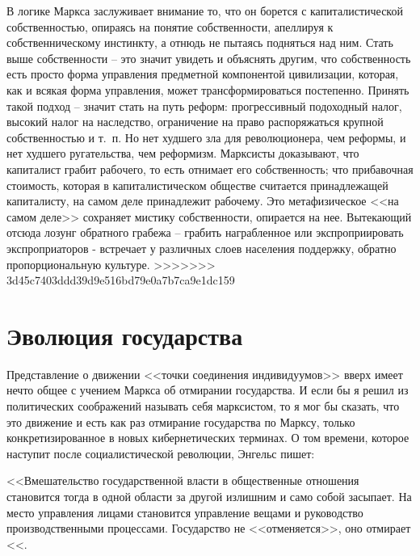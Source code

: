 \documentclass{book}
\begin{document}
В логике Маркса заслуживает внимание то, что он борется с капиталистической собственностью, опираясь на понятие соб­ственности, апеллируя к собственническому инстинкту, а отнюдь не пытаясь подняться над ним. Стать выше собственности -- это значит увидеть и объяснять другим, что собственность есть просто форма управления предметной компонентой цивилиза­ции, которая, как и всякая форма управления, может транс­формироваться постепенно. Принять такой подход -- значит стать на путь реформ: прогрессивный подоходный налог, высо­кий налог на наследство, ограничение на право распоряжаться крупной собственностью и т.~п. Но нет худшего зла для рево­люционера, чем реформы, и нет худшего ругательства, чем ре­формизм. Марксисты доказывают, что капиталист грабит  рабо­чего, то есть отнимает его собственность;  что прибавочная сто­имость, которая в капиталистическом обществе считается при­надлежащей капиталисту, на самом деле  принадлежит рабочему. Это метафизическое <<на самом деле>> сохраняет мистику собст­венности, 
опирается на нее. Вытекающий отсюда лозунг обрат­ного грабежа -- грабить награбленное или экспроприировать экспроприаторов - встречает у различных слоев населения поддержку, обратно пропорциональную культуре.
>>>>>>> 3d45c7403ddd39d9e516bd79e0a7b7ca9e1dc159


\section{Эволюция государства}

Представление о движении <<точки соединения индивиду­умов>> вверх имеет нечто общее с учением Маркса об отмира­нии государства. И если бы я решил из политических сообра­жений называть себя марксистом, то я мог бы сказать, что это движение и есть как раз отмирание государства по Марксу, только конкретизированное в новых кибернетических терми­нах. О том времени, которое наступит после социалистической революции, Энгельс пишет:

<<Вмешательство государственной власти в общественные отношения становится тогда в одной области за другой излиш­ним и само собой засыпает. На место управления лицами стано­вится управление вещами и руководство производственными процессами. Государство не <<отменяется>>, оно отмирает <<. 
\end{document}
